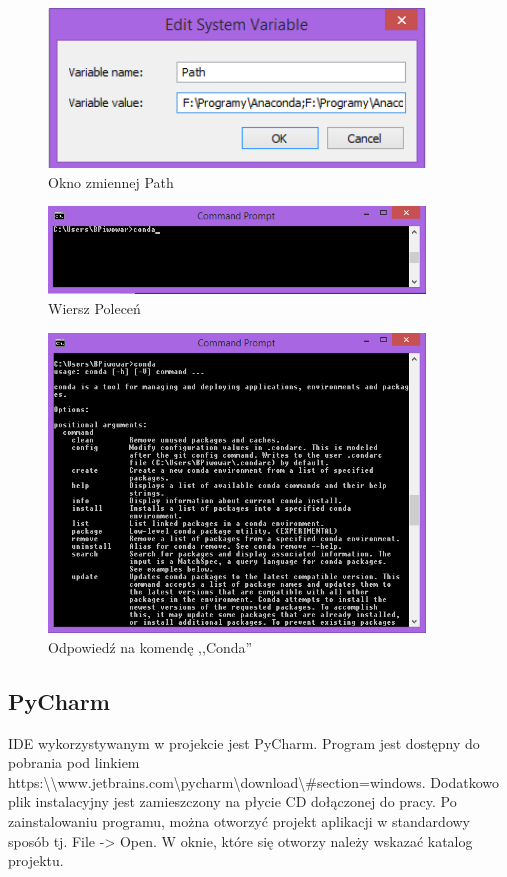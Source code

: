 \begin{figure}[h]
\centering
\includegraphics[width=10cm]{Zdjecia/5/anaconda6}
\caption{Okno zmiennej Path}
\label{fig:anaconda6}
\end{figure}


\begin{figure}[h]
\centering
\includegraphics[width=10cm]{Zdjecia/5/anaconda7}
\caption{Wiersz Poleceń}
\label{fig:anaconda7}
\end{figure}

\begin{figure}[h]
\centering
\includegraphics[width=10cm]{Zdjecia/5/anaconda8}
\caption{Odpowiedź na komendę ,,Conda''}
\label{fig:anaconda8}
\end{figure}

\subsection{PyCharm}
\label{sec:pycharm}

IDE wykorzystywanym w projekcie jest PyCharm. Program jest dostępny do pobrania pod linkiem https:\textbackslash \textbackslash www.jetbrains.com\textbackslash pycharm\textbackslash download\textbackslash \#section=windows. Dodatkowo plik instalacyjny jest zamieszczony na płycie CD dołączonej do pracy. Po zainstalowaniu programu, można otworzyć projekt aplikacji w standardowy sposób tj. File -> Open. W oknie, które się otworzy należy wskazać katalog projektu.

